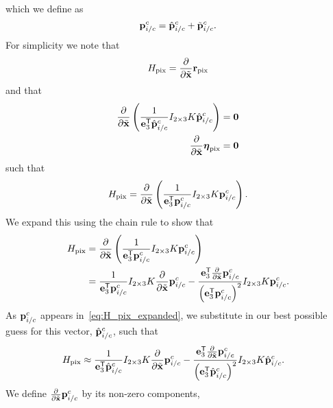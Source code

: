 which we define as
\begin{equation*}
  \boldsymbol{\mathrm{p}}_{i/c}^c = \hat{\boldsymbol{\mathrm{p}}}_{i/c}^c + \tilde{\boldsymbol{\mathrm{p}}}_{i/c}^c .
\end{equation*}
For simplicity we note that 
\begin{equation}
  H_{\text{pix}} = \frac{\partial}{\partial \tilde{\boldsymbol{\mathrm{x}}}} \boldsymbol{\mathrm{r}}_{\text{pix}}
\end{equation}
and that
\begin{align*}
  \frac{\partial}{\partial \tilde{\boldsymbol{\mathrm{x}}}} \left( \frac{1}{\boldsymbol{\mathrm{e}}_3^{\mathsf{T}} \hat{\boldsymbol{\mathrm{p}}}_{i/c}^c} I_{2 \times 3} K
  \hat{\boldsymbol{\mathrm{p}}}_{i/c}^c \right) &= \boldsymbol{\mathrm{0}}
\\
  \frac{\partial}{\partial \tilde{\boldsymbol{\mathrm{x}}}} \boldsymbol{\mathrm{\eta}}_{\text{pix}} &= \boldsymbol{\mathrm{0}}
\end{align*}
such that
\begin{equation}
  H_{\text{pix}} = \frac{\partial}{\partial \tilde{\boldsymbol{\mathrm{x}}}}
 \left( \frac{1}{\boldsymbol{\mathrm{e}}_3^{\mathsf{T}} \boldsymbol{\mathrm{p}}_{i/c}^c} I_{2 \times 3} K
 \boldsymbol{\mathrm{p}}_{i/c}^c \right).
\end{equation}
We expand this using the chain rule to show that
\begin{align}
  H_{\text{pix}} &= \frac{\partial}{\partial \tilde{\boldsymbol{\mathrm{x}}}}
 \left( \frac{1}{\boldsymbol{\mathrm{e}}_3^{\mathsf{T}} \boldsymbol{\mathrm{p}}_{i/c}^c} I_{2 \times 3} K
 \boldsymbol{\mathrm{p}}_{i/c}^c \right) \\
  &= 
 \frac{1}{\boldsymbol{\mathrm{e}}_3^{\mathsf{T}} \boldsymbol{\mathrm{p}}_{i/c}^c} I_{2 \times 3} K
 \frac{\partial}{\partial \tilde{\boldsymbol{\mathrm{x}}}} \boldsymbol{\mathrm{p}}_{i/c}^c 
 - \frac{\boldsymbol{\mathrm{e}}_3^{\mathsf{T}} \frac{\partial}{\partial \tilde{\boldsymbol{\mathrm{x}}}} 
 \boldsymbol{\mathrm{p}}_{i/c}^c}{\left( \boldsymbol{\mathrm{e}}_3^{\mathsf{T}}
 \boldsymbol{\mathrm{p}}_{i/c}^c \right)^2 } I_{2 \times 3} K
  \boldsymbol{\mathrm{p}}_{i/c}^c. 
  \label{eq:H_pix_expanded}
\end{align}
As $\boldsymbol{\mathrm{p}}_{i/c}^c$ appears in~\eqref{eq:H_pix_expanded}, we substitute in our
best possible guess for this vector, $\hat{\boldsymbol{\mathrm{p}}}_{i/c}^c$, such that
\begin{align}
  H_{\text{pix}} 
  &\approx
  \frac{1}{\boldsymbol{\mathrm{e}}_3^{\mathsf{T}} \hat{\boldsymbol{\mathrm{p}}}_{i/c}^c} I_{2 \times 3} K
 \frac{\partial}{\partial \tilde{\boldsymbol{\mathrm{x}}}} \boldsymbol{\mathrm{p}}_{i/c}^c 
 - \frac{\boldsymbol{\mathrm{e}}_3^{\mathsf{T}} \frac{\partial}{\partial \tilde{\boldsymbol{\mathrm{x}}}} 
 \boldsymbol{\mathrm{p}}_{i/c}^c}{\left( \boldsymbol{\mathrm{e}}_3^{\mathsf{T}}
 \hat{\boldsymbol{\mathrm{p}}}_{i/c}^c \right)^2 } I_{2 \times 3} K
 \hat{\boldsymbol{\mathrm{p}}}_{i/c}^c. 
\end{align}
We define $\frac{\partial}{\partial \tilde{\boldsymbol{\mathrm{x}}}} \boldsymbol{\mathrm{p}}_{i/c}^c$ by its
non-zero components,
